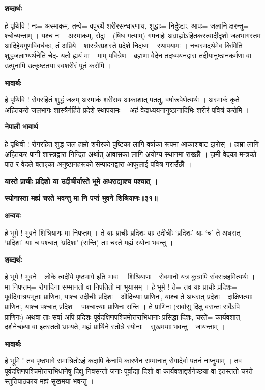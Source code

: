 \documentclass[11pt, a5paper]{article}
\begin{document}
\textbf{शब्दार्थः}

हे पृथिवि ! नः= अस्माकम्, तन्वे= वपुरर्थे शरीरसन्धारणाय, शुद्धाः= निर्दुष्टाः, आपः= जलानि क्षरन्तु= श्चोच्यन्ताम् । यश्च नः= अस्माकम्, सेदुः= (षिध गत्याम्) गमनार्हः अग्राह्योऽहितकरत्वादीदृशो जलभागस्तम आदिहेयगुणविवर्धकः, तं अप्रिये= शास्त्रैरप्रशस्ते प्रदेशे निदध्मः= स्थापयामः । नन्वस्मदर्थमेव किमिति शुद्धजलाभ्यर्थनेति चेद्- यतो ह्ययं मा= माम् पवित्रेण= ब्रह्मणा वेदेन तदध्ययनद्वारा तदीयानुष्ठानकर्मणा वा उत्पुनामि उत्कृष्टतया स्वशरीरं पूतं करोमि ।

\textbf{भावार्थः}

हे पृथिवि ! रोगरहितं शुद्धं जलम् अस्माकं शरीराय आकाशात् पततु, वर्षारूपेणेत्यर्थः । अस्माकं कृते अहितकरो जलभागः शास्त्रैर्गर्हिते प्रदेशे स्थापयामः । अहं वेदाध्ययनानुष्ठानादिभिः शरीरं पवित्रं करोमि ।

\textbf{नेपाली भावार्थ}

हे पृथिवी ! रोगरहित शुद्ध जल हाम्रो शरीरको पुष्टिका लागि वर्षाका रूपमा आकाशबाट झरोस् । हाम्रा लागि अहितकर पानी शास्त्रद्वारा निन्दित अर्थात् आवासका लागि अयोग्य स्थानमा राख्छौँ । हामी वेदका मन्त्रको पाठ र वेदले बताएका अनुष्ठानहरूको सम्पादनद्वारा आफूलाई पवित्र गराउँछौँ ।

\textbf{यास्ते प्राचीः प्रदिशो या उदीचीर्यास्ते भूमे अधराद्याश्च पश्चात् ।}

\textbf{स्योनास्ता मह्यं चरते भवन्तु मा नि पप्तं भुवने शिश्रियाणः॥३१॥}

\textbf{अन्वयः}

हे भूमे ! भुवने शिश्रियाणः मा निपप्तम् । ते याः प्राचीः प्रदिशः याः उदीचीः ‘प्रदिशः’ याः ‘च’ ते अधरात् ‘प्रदिशः’ याः च पश्चात् ‘प्रदिशः’ (सन्ति) ताः चरते मह्यं स्योनः भवन्तु ।

\textbf{शब्दार्थः}

हे भूमे ! भुवने= लोके त्वदीये पृष्ठभागे इति भावः । शिश्रियाणः= सेवमानो यत्र कुत्रापि संवसन्नहमित्यर्थः । मा निपप्तम्= रोगादिना सम्मानतो वा निपतितो मा भूयासम् । हे भूमे ! ते= तव याः प्राचीः प्रदिशः= पूर्वदिगाश्रयभूताः प्राणिनः, याश्च उदीचीः प्रदिशः‍= औदिच्याः प्राणिनः, याश्च ते अधरात् प्रदेशः= दाक्षिणत्याः प्राणिनः, याश्च पश्चात् प्रदिशः= पाश्चात्त्याः प्राणिनः सन्ति । ते प्राणिनः (सर्वासु दिक्षु वसन्तः सर्वेऽपि प्राणिनः) अथवा ताः सर्वा अपि प्रदिशः पूर्वदक्षिणपश्चिमोत्तराभिधानाः प्रसिद्धा दिशः, चरते= कार्यवशात् दर्शनेच्छया वा इतस्ततो भ्राम्यते, मह्यं प्रार्थिने स्तोत्रे स्योनाः= सुखमयाः भवन्तु= जायन्ताम् ।

\textbf{भावार्थः}

हे भूमि ! तव पृष्ठभागे समाश्रितोऽहं कदापि केनापि कारणेन सम्मानात् रोगादेर्वा पतनं नाप्नुयाम् । तव पूर्वदक्षिणपश्चिमोत्तराभिधानेषु दिक्षु निवसन्तो जनाः पूर्वाद्या दिशो वा कार्यवशाद्दर्शनेच्छया वा इतस्ततो चरते स्तुतिपाठकाय मह्यं सुखमया भवन्तु ।
\end{document}
